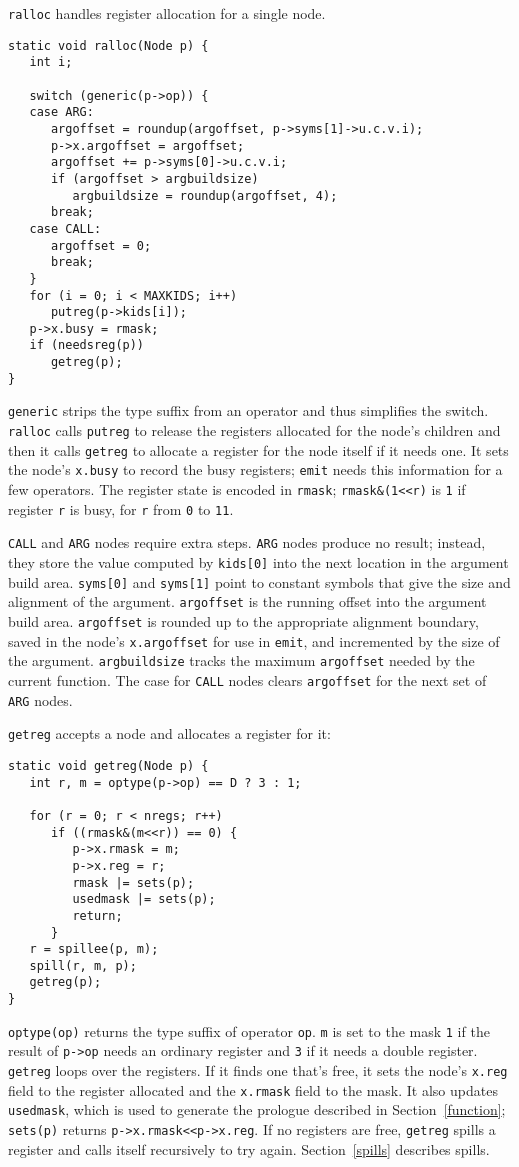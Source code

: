 \verb|ralloc| handles register allocation for a single node.
\begin{verbatim}
static void ralloc(Node p) {
   int i;

   switch (generic(p->op)) {
   case ARG:
      argoffset = roundup(argoffset, p->syms[1]->u.c.v.i);
      p->x.argoffset = argoffset;
      argoffset += p->syms[0]->u.c.v.i;
      if (argoffset > argbuildsize)
         argbuildsize = roundup(argoffset, 4);
      break;
   case CALL:
      argoffset = 0;
      break;
   }
   for (i = 0; i < MAXKIDS; i++)
      putreg(p->kids[i]);
   p->x.busy = rmask;
   if (needsreg(p))
      getreg(p);
}
\end{verbatim}
\verb|generic| strips the type suffix from an operator and
thus simplifies the switch.  \verb|ralloc| calls \verb|putreg| to
release the registers allocated for the node's children and then it
calls \verb|getreg| to allocate a register for the node itself if it needs one.  It sets
the node's \verb|x.busy| to record the busy registers; \verb|emit|
needs this information for a few operators.  The register state is
encoded in \verb|rmask|; \verb|rmask&(1<<r)| is \verb|1| if register
\verb|r| is busy, for \verb|r| from \verb|0| to \verb|11|.

\verb|CALL| and \verb|ARG| nodes require extra steps.  \verb|ARG| nodes
produce no result; instead, they store the value computed by
\verb|kids[0]| into the next location in the argument build area.
\verb|syms[0]| and \verb|syms[1]| point to constant symbols that give
the size and alignment of the argument.  \verb|argoffset| is the
running offset into the argument build area.
\verb|argoffset| is rounded up to the appropriate alignment boundary, saved
in the node's \verb|x.argoffset| for use in \verb|emit|, and incremented
by the size of the argument.  \verb|argbuildsize| tracks the maximum
\verb|argoffset| needed by the current function.  The case for \verb|CALL| nodes
clears \verb|argoffset| for the next set of \verb|ARG| nodes.

\verb|getreg|
accepts a node and allocates a register for it:
\begin{verbatim}
static void getreg(Node p) {
   int r, m = optype(p->op) == D ? 3 : 1;

   for (r = 0; r < nregs; r++)
      if ((rmask&(m<<r)) == 0) {
         p->x.rmask = m;
         p->x.reg = r;
         rmask |= sets(p);
         usedmask |= sets(p);
         return;
      }
   r = spillee(p, m);
   spill(r, m, p);
   getreg(p);
}
\end{verbatim}
\verb|optype(op)| returns the type suffix of operator \verb|op|.
\verb|m| is set to the mask \verb|1| if
the result of \verb|p->op| needs an ordinary register and \verb|3| if it
needs a double register.
\verb|getreg| loops over the registers. If it finds one that's free,
it sets the node's \verb|x.reg| field to the register allocated and the
\verb|x.rmask| field to the mask. It also
updates \verb|usedmask|, which is used to generate the prologue
described in Section~\ref{function}; \verb|sets(p)| returns
\verb|p->x.rmask<<p->x.reg|.  If no registers are free, \verb|getreg|
spills a register and calls itself recursively to try again.
Section~\ref{spills} describes spills.

